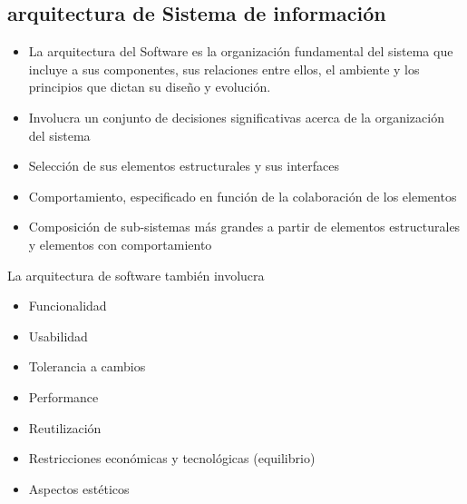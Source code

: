 \documentclass[12pt,a4paper]{article}
\begin{document}
\subsection*{arquitectura de Sistema de información}
\begin{itemize}
    \item La arquitectura del Software es la organización fundamental del sistema que incluye a sus componentes, sus relaciones entre ellos, el ambiente y los principios que dictan su diseño y evolución.
    \item Involucra un conjunto de decisiones significativas acerca de la organización del sistema
    \item Selección de sus elementos estructurales y sus interfaces
    \item Comportamiento, especificado en función de la colaboración de los elementos
    \item Composición de sub-sistemas más grandes a partir de elementos estructurales y elementos con comportamiento
\end{itemize}
La arquitectura de software también involucra
\begin{itemize}
    \item Funcionalidad
    \item Usabilidad
    \item Tolerancia a cambios
    \item Performance
    \item Reutilización
    \item Restricciones económicas y tecnológicas (equilibrio)
    \item Aspectos estéticos
\end{itemize}
\end{document}
